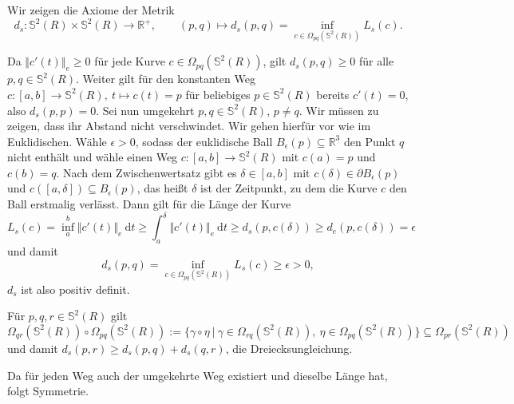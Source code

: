 \documentclass[11pt]{book}
\numberwithin{dummy}{section}
\theoremstyle{nonumberbreak}
\newenvironment{prob}[1][]{\ifthenelse{\equal{#1}{}}{\problem}{\problem[#1]}\rm}{\endproblem}
\newenvironment{sol}[1][]{\ifthenelse{\equal{#1}{}}{\solution}{\solution[#1]}\rm}{\endsolution}
\newcommand{\R}{\mathbb{R}}
\newcommand{\Sph}{\mathbb{S}}
\newcommand{\la}{\longrightarrow}
\begin{document}
\begin{spacing}{1.4}
\begin{prob}
\begin{sol}
\begin{compactenum}
\item Wir zeigen die Axiome der Metrik 
$$d_s: \Sph^2(R) \times \Sph^2(R) \la \R^+, \qquad (p,q) \mapsto d_s(p,q)=\inf_{c \in \Omega_{pq}(\Sph^2(R))} L_s(c).$$
\begin{compactenum}
\item Da $\Vert c'(t)\Vert_e \geqslant 0$ für jede Kurve $c \in \Omega_{pq}(\Sph^2(R))$, gilt $d_s(p,q)\geqslant 0$ für alle $p, q\in \Sph^2(R)$. Weiter gilt für den konstanten Weg $c:[a,b] \la \Sph^2(R), \ t \mapsto c(t)=p$ für beliebiges $p \in \Sph^2(R)$ bereits $c'(t)=0$, also $d_s(p,p)=0$. Sei nun umgekehrt $p,q\in \Sph^2(R)$, $p\neq q$. Wir müssen zu zeigen, dass ihr Abstand nicht verschwindet. Wir gehen hierfür vor wie im Euklidischen. Wähle $\epsilon>0$, sodass der euklidische Ball $B_{\epsilon}(p) \subseteq \R^3$ den Punkt $q$ nicht enthält und wähle einen Weg $c:[a,b] \la \Sph^2(R)$ mit $c(a)=p$ und $c(b)=q$. Nach dem Zwischenwertsatz gibt es $\delta \in [a,b]$ mit $c(\delta) \in \partial B_{\epsilon}(p)$ und $c([a,\delta]) \subseteq B_{\epsilon}(p)$, das heißt $\delta$ ist der Zeitpunkt, zu dem die Kurve $c$ den Ball erstmalig verlässt. Dann gilt für die Länge der Kurve
$$L_s(c) = \inf_a^b \Vert c'(t)\Vert_e \ \mathrm{d}t \geqslant \int_a^{\delta} \Vert c'(t)\Vert_e \ \mathrm{d}t \geqslant d_s(p,c(\delta)) \geqslant d_e(p,c(\delta)) = \epsilon$$
und damit 
$$d_s(p,q) = \inf_{c \in \Omega_{pq}(\Sph^2(R))} L_s(c) \geqslant \epsilon >0,$$
$d_s$ ist also positiv definit.
\item Für $p,q,r \in \Sph^2(R)$ gilt
$$\Omega_{qr}(\Sph^2(R)) \circ \Omega_{pq}(\Sph^2(R)) := \{ \gamma \circ \eta \ \vert \ \gamma \in \Omega_{rq}(\Sph^2(R)), \ \eta \in \Omega_{pq}(\Sph^2(R)) \} \subseteq \Omega_{pr}(\Sph^2(R))$$
und damit 
$d_s(p,r) \geqslant d_s(p,q) + d_s(q,r)$, die Dreiecksungleichung.
\item Da für jeden Weg auch der umgekehrte Weg existiert und dieselbe Länge hat, folgt Symmetrie.

\end{compactenum}


\end{compactenum}
\end{sol}
\end{prob}
\end{spacing}
\end{document}
